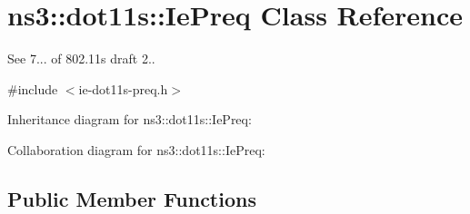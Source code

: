 \hypertarget{classns3_1_1dot11s_1_1IePreq}{}\section{ns3\+:\+:dot11s\+:\+:Ie\+Preq Class Reference}
\label{classns3_1_1dot11s_1_1IePreq}


See 7... of 802.\+11s draft 2..  




{\ttfamily \#include $<$ie-\/dot11s-\/preq.\+h$>$}



Inheritance diagram for ns3\+:\+:dot11s\+:\+:Ie\+Preq\+:


Collaboration diagram for ns3\+:\+:dot11s\+:\+:Ie\+Preq\+:
\subsection*{Public Member Functions}
